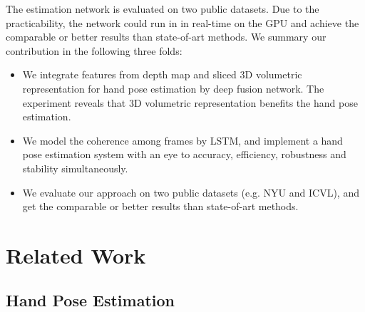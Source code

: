 \documentclass[journal,comsoc]{IEEEtran}
\begin{document}
The estimation network is evaluated on two public datasets. Due to the practicability, the network
could run in in real-time on the GPU and achieve the comparable or better results than state-of-art methods.
We summary our contribution in the following three folds:
\begin{itemize}
  \item
  We integrate features from depth map and sliced 3D volumetric representation for hand pose
  estimation by deep fusion network. The experiment reveals that 3D volumetric representation
  benefits the hand pose estimation.
  \item
  We model the coherence among frames by LSTM, and implement a hand pose
  estimation system with an eye to accuracy, efficiency, robustness and stability
  simultaneously.
  \item
  We evaluate our approach on two public datasets (e.g. NYU and ICVL), and get the
  comparable or better results than state-of-art methods.
\end{itemize}


\section{Related Work}\label{sec:related work}
\subsection{Hand Pose Estimation}


\end{document}
